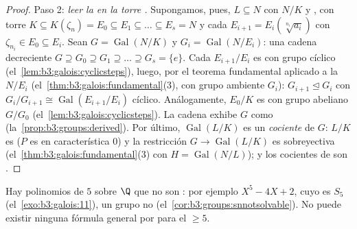\begin{proof}
Paso 2: \emph{leer la  en
la torre .} Supongamos, pues,
$L \subseteq N$ con $N/K$  y
, con torre $K
\subseteq K(\zeta_n) = E_0 \subseteq E_1 \subseteq \dots
\subseteq E_s = N$ y cada $E_{i+1} = E_i(\sqrt[n_i]{a_i})$ con
$\zeta_{n_i} \in E_0 \subseteq E_i$. Sean $G =
\operatorname{Gal}(N/K)$ y $G_i = \operatorname{Gal}(N/E_i)$: una cadena
decreciente $G \supseteq G_0 \supseteq G_1 \supseteq
\dots \supseteq G_s = \{e\}$. Cada $E_{i+1}/E_i$ es
 con grupo cíclico
(el~\cref{lem:b3:galois:cyclicsteps}), luego, por el teorema fundamental
aplicado a la  $N/E_i$
(el~\cref{thm:b3:galois:fundamental}(3), con grupo ambiente $G_i$):
$G_{i+1} \trianglelefteq G_i$ con $G_i/G_{i+1} \cong
\operatorname{Gal}(E_{i+1}/E_i)$ cíclico. Análogamente, $E_0/K$ es
 con grupo abeliano $G/G_0$
(el~\cref{lem:b3:galois:cyclicsteps}). La cadena exhibe $G$ como
(la~\cref{prop:b3:groups:derived}). Por último,
$\operatorname{Gal}(L/K)$ es un \emph{cociente} de $G$: $L/K$ es
 ($P$ es
 en característica $0$) y la
restricción $G
\to \operatorname{Gal}(L/K)$ es sobreyectiva
(el~\cref{thm:b3:galois:fundamental}(3) con $H =
\operatorname{Gal}(N/L)$); y los cocientes de
 son
.
\end{proof}

\begin{corollary}
\label{cor:b3:galois:quintic}
Hay polinomios de  $5$ sobre $\Q$
que no son : por
ejemplo $X^5 - 4X + 2$, cuyo  es $S_5$ (el~\cref{exo:b3:galois:11}), un grupo
no 
(el~\cref{cor:b3:groups:snnotsolvable}). No puede existir ninguna
fórmula general por  para el
 $\geq 5$.
\end{corollary}

